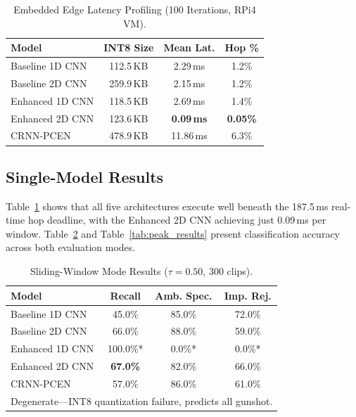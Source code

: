\documentclass[conference]{IEEEtran}
\begin{document}
\begin{table}[!t]
\centering
\caption{Embedded Edge Latency Profiling (100 Iterations, RPi4 VM).}
\label{tab:latency}
\small
\begin{tabular}{lccc}
\toprule
\textbf{Model} & \textbf{INT8 Size} & \textbf{Mean Lat.} & \textbf{Hop \%} \\
\midrule
Baseline 1D CNN & 112.5\,KB & 2.29\,ms & 1.2\% \\
Baseline 2D CNN & 259.9\,KB & 2.15\,ms & 1.2\% \\
Enhanced 1D CNN & 118.5\,KB & 2.69\,ms & 1.4\% \\
Enhanced 2D CNN & 123.6\,KB & \textbf{0.09\,ms} & \textbf{0.05\%} \\
CRNN-PCEN & 478.9\,KB & 11.86\,ms & 6.3\% \\
\bottomrule
\end{tabular}
\end{table}

\subsection{Single-Model Results}
Table~\ref{tab:latency} shows that all five architectures execute well beneath the 187.5\,ms real-time hop deadline, with the Enhanced 2D CNN achieving just 0.09\,ms per window. Table~\ref{tab:sliding_results} and Table~\ref{tab:peak_results} present classification accuracy across both evaluation modes.

\begin{table}[!t]
\centering
\caption{Sliding-Window Mode Results ($\tau = 0.50$, 300 clips).}
\label{tab:sliding_results}
\small
\begin{tabular}{lccc}
\toprule
\textbf{Model} & \textbf{Recall} & \textbf{Amb. Spec.} & \textbf{Imp. Rej.} \\
\midrule
Baseline 1D CNN & 45.0\% & 85.0\% & 72.0\% \\
Baseline 2D CNN & 66.0\% & 88.0\% & 59.0\% \\
Enhanced 1D CNN & 100.0\%* & 0.0\%* & 0.0\%* \\
Enhanced 2D CNN & \textbf{67.0\%} & 82.0\% & 66.0\% \\
CRNN-PCEN & 57.0\% & 86.0\% & 61.0\% \\
\bottomrule
\multicolumn{4}{l}{\footnotesize *Degenerate---INT8 quantization failure, predicts all gunshot.}
\end{tabular}
\end{table}
\end{document}
